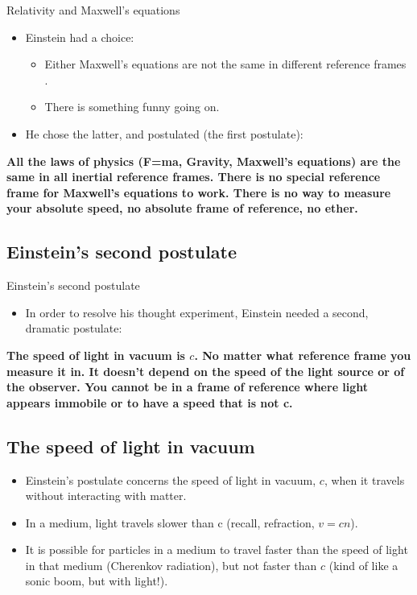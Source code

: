 \documentclass[aspectratio=169,
hyperref={colorlinks,urlcolor=blue}
]{beamer}
\begin{document}
\begin{frame}{Relativity and Maxwell's equations}
\begin{itemize}
\item Einstein had a choice:
\begin{itemize}
\item Either Maxwell’s equations are not the same in different reference frames .
\item There is something funny going on.
\end{itemize}
\item He chose the latter, and postulated (the first postulate):
\end{itemize}
\textbf{All the laws of physics (F=ma, Gravity, Maxwell's equations) are the same in all inertial reference frames. There is no special reference frame for Maxwell's equations to work. There is no way to measure your absolute speed, no absolute frame of reference, no ether.}
\end{frame}

\subsection{Einstein's second postulate}
\begin{frame}{Einstein's second postulate}
\begin{itemize}
\item In order to resolve his thought experiment, Einstein needed a second, dramatic postulate:
\end{itemize}
\textbf{The speed of light in vacuum is $c$. No matter what reference frame you measure it in. It doesn't depend on the speed of the light source or of the observer. You cannot be in a frame of reference where light appears immobile or to have a speed that is not c.}
\end{frame}


\subsection{The speed of light in vacuum}
\label{subsec:thespeedoflightinvacuum}
{
\begin{itemize}
\item Einstein’s postulate concerns the speed of light in vacuum, $c$, when it travels without interacting with matter.
\item In a medium, light travels slower than c (recall, refraction, $v = cn$).
\item It is possible for particles in a medium to travel faster than the speed of light in that medium (Cherenkov radiation), but not faster than $c$ (kind of like a sonic boom, but with light!).
\end{itemize}
}
{
\vspace{-1.25cm}
}
\end{document}
